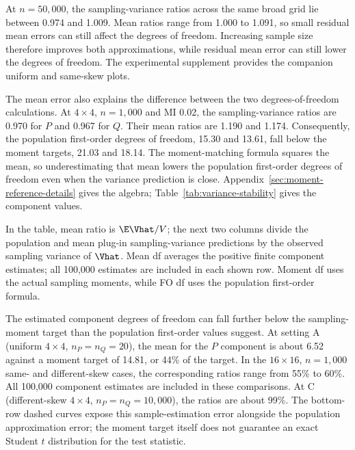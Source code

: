 At \(n=50{,}000\), the sampling-variance ratios across the same broad grid
lie between 0.974 and 1.009. Mean ratios range from 1.000 to 1.091, so
small residual mean errors can still affect the degrees of freedom.
Increasing sample size therefore improves both approximations, while
residual mean error can still lower the degrees of freedom. The
experimental supplement provides the companion uniform and same-skew
plots.

The mean error also explains the difference between the two
degrees-of-freedom calculations. At \(4\times4\), \(n=1{,}000\) and MI 0.02, the
sampling-variance ratios are 0.970 for \(P\) and 0.967 for \(Q\).
Their mean ratios are 1.190 and 1.174. Consequently, the population
first-order degrees of freedom, 15.30 and 13.61, fall below the moment
targets, 21.03 and 18.14. The moment-matching formula squares the mean, so underestimating that
mean lowers the population first-order degrees of freedom even when the
variance prediction is close. Appendix~\ref{sec:moment-reference-details}
gives the algebra; Table~\ref{tab:variance-stability} gives the component
values.

\begin{table}[!htbp]
\centering
\small
\setlength{\tabcolsep}{3pt}
\caption{Component moment and degrees-of-freedom comparisons at \(4\times4\), \(n=1{,}000\), different skew.}
\label{tab:variance-stability}

\end{table}

In the table, mean ratio is \(\E\Vhat/V\); the next two columns divide
the population and mean plug-in sampling-variance predictions by the
observed sampling variance of \(\Vhat\). Mean df averages the positive
finite component estimates; all 100,000 estimates are included in each
shown row. Moment df uses the actual sampling moments, while FO df uses
the population first-order formula.

The estimated component degrees of freedom can fall further below the
sampling-moment target than the population first-order values suggest.
At setting A (uniform \(4\times4\), \(n_P=n_Q=20\)), the mean for the
\(P\) component is about 6.52 against a moment target of 14.81, or
44\% of the target. In the \(16\times16\), \(n=1{,}000\) same- and
different-skew cases, the corresponding ratios range from 55\% to 60\%.
All 100,000 component estimates are included in these comparisons.
At C (different-skew \(4\times4\), \(n_P=n_Q=10{,}000\)), the ratios
are about 99\%. The bottom-row dashed curves expose this
sample-estimation error alongside the population approximation error;
the moment target itself does not guarantee an exact Student \(t\)
distribution for the test statistic.

